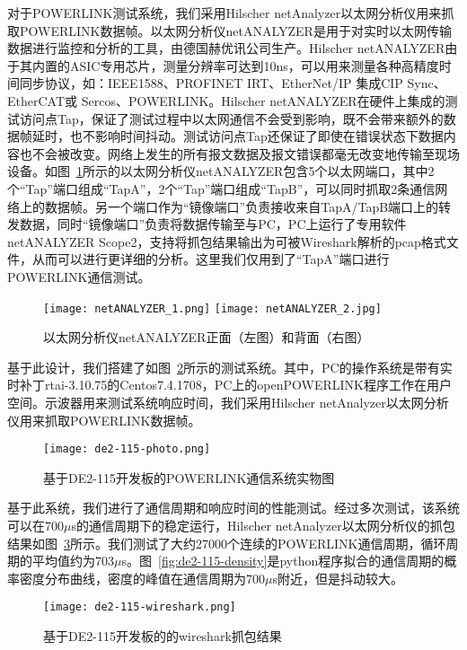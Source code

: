 对于POWERLINK测试系统，我们采用Hilscher netAnalyzer以太网分析仪用来抓取POWERLINK数据帧。以太网分析仪netANALYZER是用于对实时以太网传输数据进行监控和分析的工具，由德国赫优讯公司生产。Hilscher netANALYZER由于其内置的ASIC专用芯片，测量分辨率可达到10ns，可以用来测量各种高精度时间同步协议，如：IEEE1588、PROFINET IRT、EtherNet/IP 集成CIP Sync、EtherCAT或 Sercos、POWERLINK。Hilscher netANALYZER在硬件上集成的测试访问点Tap，保证了测试过程中以太网通信不会受到影响，既不会带来额外的数据帧延时，也不影响时间抖动。测试访问点Tap还保证了即使在错误状态下数据内容也不会被改变。网络上发生的所有报文数据及报文错误都毫无改变地传输至现场设备。如图~\ref{fig:netANALYZER-photo}所示的以太网分析仪netANALYZER包含5个以太网端口，其中2个“Tap”端口组成“TapA”，2个“Tap”端口组成“TapB”，可以同时抓取2条通信网络上的数据帧。另一个端口作为“镜像端口”负责接收来自TapA/TapB端口上的转发数据，同时“镜像端口”负责将数据传输至与PC，PC上运行了专用软件netANALYZER Scope2，支持将抓包结果输出为可被Wireshark解析的pcap格式文件，从而可以进行更详细的分析。这里我们仅用到了“TapA”端口进行POWERLINK通信测试。

\begin{figure}[htb]\centering
  \texttt{[image: netANALYZER\_1.png]}  
  \texttt{[image: netANALYZER\_2.jpg]}
  \caption{以太网分析仪netANALYZER正面（左图）和背面（右图）}
  \label{fig:netANALYZER-photo}
\end{figure}


基于此设计，我们搭建了如图~\ref{fig:de2-115-photo}所示的测试系统。其中，PC的操作系统是带有实时补丁rtai-3.10.75的Centos7.4.1708，PC上的openPOWERLINK程序工作在用户空间。示波器用来测试系统响应时间，我们采用Hilscher netAnalyzer以太网分析仪用来抓取POWERLINK数据帧。
\begin{figure}[!htb]
  \centering
  \texttt{[image: de2-115-photo.png]}
  \caption{基于DE2-115开发板的POWERLINK通信系统实物图}
  \label{fig:de2-115-photo}
\end{figure}

基于此系统，我们进行了通信周期和响应时间的性能测试。经过多次测试，该系统可以在700$\mu$s的通信周期下的稳定运行，Hilscher netAnalyzer以太网分析仪的抓包结果如图~\ref{fig:de2-115-wireshark}所示。我们测试了大约27000个连续的POWERLINK通信周期，循环周期的平均值约为703$\mu$s。图~\ref{fig:de2-115-density}是python程序拟合的通信周期的概率密度分布曲线，密度的峰值在通信周期为700$\mu$s附近，但是抖动较大。

\begin{figure}[!htb]
  \centering
  \texttt{[image: de2-115-wireshark.png]}
  \caption{基于DE2-115开发板的的wireshark抓包结果}
  \label{fig:de2-115-wireshark}
\end{figure}

